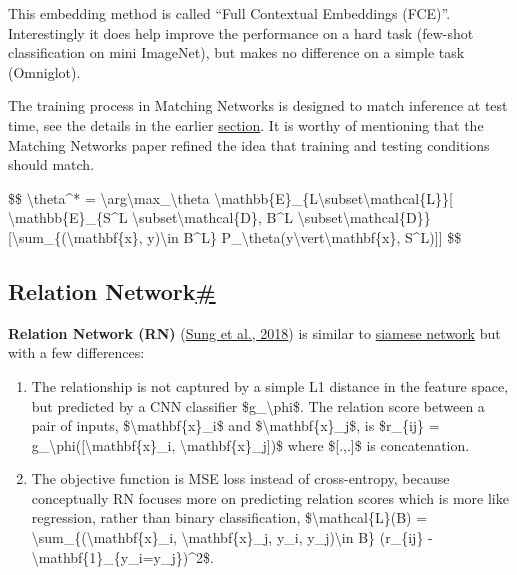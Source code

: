 This embedding method is called ``Full Contextual Embeddings (FCE)''. Interestingly it does help improve the performance on a hard task (few-shot classification on mini ImageNet), but makes no difference on a simple task (Omniglot).

The training process in Matching Networks is designed to match inference at test time, see the details in the earlier \hyperref[training-in-the-same-way-as-testing]{section}. It is worthy of mentioning that the Matching Networks paper refined the idea that training and testing conditions should match.

\$\$ \textbackslash theta\^{}* = \textbackslash arg\textbackslash max\_\textbackslash theta \textbackslash mathbb\{E\}\_\{L\textbackslash subset\textbackslash mathcal\{L\}\}{[} \textbackslash mathbb\{E\}\_\{S\^{}L \textbackslash subset\textbackslash mathcal\{D\}, B\^{}L \textbackslash subset\textbackslash mathcal\{D\}\} {[}\textbackslash sum\_\{(\textbackslash mathbf\{x\}, y)\textbackslash in B\^{}L\} P\_\textbackslash theta(y\textbackslash vert\textbackslash mathbf\{x\}, S\^{}L){]}{]} \$\$

\subsection{\texorpdfstring{Relation Network\hyperref[relation-network]{\#}}{Relation Network\#}}\label{relation-network}

\textbf{Relation Network (RN)} (\href{http://openaccess.thecvf.com/content_cvpr_2018/papers_backup/Sung_Learning_to_Compare_CVPR_2018_paper.pdf}{Sung et al., 2018}) is similar to \hyperref[convolutional-siamese-neural-network]{siamese network} but with a few differences:

\begin{enumerate}
\tightlist
\item
  The relationship is not captured by a simple L1 distance in the feature space, but predicted by a CNN classifier \$g\_\textbackslash phi\$. The relation score between a pair of inputs, \$\textbackslash mathbf\{x\}\_i\$ and \$\textbackslash mathbf\{x\}\_j\$, is \$r\_\{ij\} = g\_\textbackslash phi({[}\textbackslash mathbf\{x\}\_i, \textbackslash mathbf\{x\}\_j{]})\$ where \${[}.,.{]}\$ is concatenation.
\item
  The objective function is MSE loss instead of cross-entropy, because conceptually RN focuses more on predicting relation scores which is more like regression, rather than binary classification, \$\textbackslash mathcal\{L\}(B) = \textbackslash sum\_\{(\textbackslash mathbf\{x\}\_i, \textbackslash mathbf\{x\}\_j, y\_i, y\_j)\textbackslash in B\} (r\_\{ij\} - \textbackslash mathbf\{1\}\_\{y\_i=y\_j\})\^{}2\$.
\end{enumerate}

